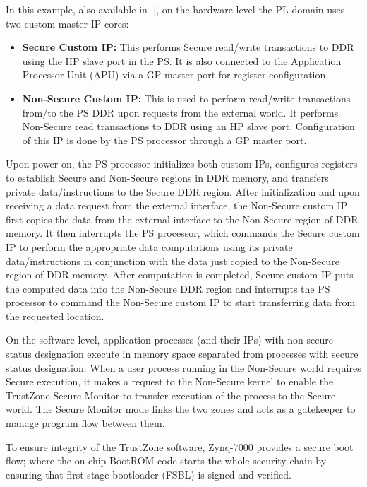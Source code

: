 \documentclass[sigconf]{acmart}
\theoremstyle{plain}
\theoremstyle{remark}
\begin{document}
In this example, also available in [], on the hardware level the PL domain uses two custom master IP cores:

\begin{itemize}
\item \textbf{Secure Custom IP:}
This performs Secure read/write transactions to DDR using the HP slave port in the PS. It is also connected to the Application Processor Unit (APU) via a GP master port for register configuration.
\item \textbf{Non-Secure Custom IP:}
This is used to perform read/write transactions from/to the PS DDR upon requests from the external world. It performs Non-Secure read transactions to DDR using an HP slave port. Configuration of this IP is done by the PS processor through a GP master port.
\end{itemize}

Upon power-on, the PS processor initializes both custom IPs, configures registers to establish Secure and Non-Secure regions in DDR memory, and transfers private data/instructions to the Secure DDR region. After initialization and upon receiving a data request from the external interface, the
Non-Secure custom IP first copies the data from the external interface to the Non-Secure region of DDR memory. It then interrupts the PS processor, which commands the Secure custom IP to perform the appropriate data computations using its private data/instructions in conjunction with the data just copied to the Non-Secure region of DDR memory. After computation is completed, Secure custom IP puts the computed data into the Non-Secure DDR region and interrupts the PS processor to command the Non-Secure custom IP to start transferring data from the requested location.

On the software level, application processes (and their IPs) with non-secure status designation execute in memory space separated from processes with secure status designation. When a user process running in the Non-Secure world requires Secure execution, it makes a request to the Non-Secure kernel to enable the TrustZone Secure Monitor to transfer execution of the process to the Secure world. The Secure Monitor mode links the two zones and acts as a gatekeeper to manage program flow between them.

To ensure integrity of the TrustZone software, Zynq-7000 provides a secure boot flow; where the on-chip BootROM code starts the whole security chain by ensuring that first-stage bootloader (FSBL) is signed and verified.
\end{document}
